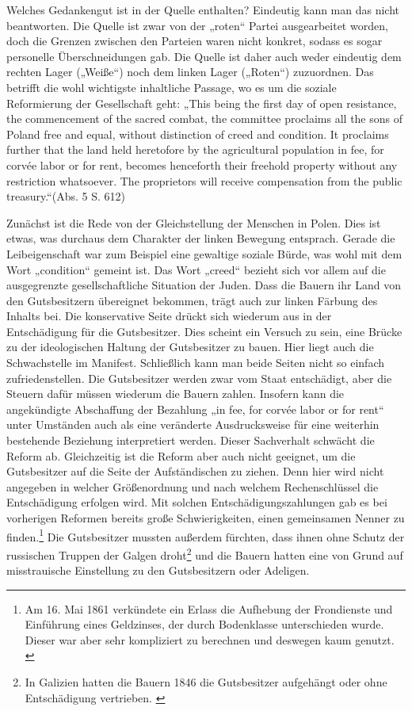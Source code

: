 \documentclass{../../sem_paper}
\begin{document}
Welches Gedankengut ist in der Quelle enthalten? Eindeutig kann man das nicht beantworten. Die
Quelle ist zwar von der „roten“ Partei ausgearbeitet worden, doch die Grenzen zwischen den
Parteien waren nicht konkret, sodass es sogar personelle Überschneidungen gab.\autocite[19]{kowalski1954} Die Quelle ist
daher auch weder eindeutig dem rechten Lager („Weiße“) noch dem linken Lager („Roten“)
zuzuordnen. Das betrifft die wohl wichtigste inhaltliche Passage, wo es um die soziale
Reformierung der Gesellschaft geht: „This being the first day of open resistance, the
commencement of the sacred combat, the committee proclaims all the sons of Poland free and
equal, without distinction of creed and condition. It proclaims further that the land held heretofore
by the agricultural population in fee, for corvée labor or for rent, becomes henceforth their freehold
property without any restriction whatsoever. The proprietors will receive compensation from the
public treasury.“(Abs. 5 S. 612)

Zunächst ist die Rede von der Gleichstellung der Menschen in Polen. Dies ist etwas, was durchaus
dem Charakter der linken Bewegung entsprach. Gerade die Leibeigenschaft war zum Beispiel eine
gewaltige soziale Bürde, was wohl mit dem Wort „condition“ gemeint ist. Das Wort „creed“ bezieht
sich vor allem auf die ausgegrenzte gesellschaftliche Situation der Juden. Dass die Bauern ihr Land
von den Gutsbesitzern übereignet bekommen, trägt auch zur linken Färbung des Inhalts bei. Die
konservative Seite drückt sich wiederum aus in der Entschädigung für die Gutsbesitzer. Dies scheint
ein Versuch zu sein, eine Brücke zu der ideologischen Haltung der Gutsbesitzer zu bauen. Hier liegt
auch die Schwachstelle im Manifest. Schließlich kann man beide Seiten nicht so einfach
zufriedenstellen. Die Gutsbesitzer werden zwar vom Staat entschädigt, aber die Steuern dafür
müssen wiederum die Bauern zahlen. Insofern kann die angekündigte Abschaffung der Bezahlung
„in fee, for corvée labor or for rent“ unter Umständen auch als eine veränderte Ausdrucksweise für
eine weiterhin bestehende Beziehung interpretiert werden. Dieser Sachverhalt schwächt die Reform
ab. Gleichzeitig ist die Reform aber auch nicht geeignet, um die Gutsbesitzer auf die Seite der
Aufständischen zu ziehen. Denn hier wird nicht angegeben in welcher Größenordnung und nach
welchem Rechenschlüssel die Entschädigung erfolgen wird. Mit solchen Entschädigungszahlungen
gab es bei vorherigen Reformen bereits große Schwierigkeiten, einen gemeinsamen Nenner zu
finden.\footnote{
Am 16. Mai 1861 verkündete ein Erlass die Aufhebung der Frondienste und Einführung eines Geldzinses, der durch
Bodenklasse unterschieden wurde. Dieser war aber sehr kompliziert zu berechnen und deswegen kaum genutzt.
\autocite[82]{gentzen1958}}
Die Gutsbesitzer mussten außerdem fürchten, dass ihnen ohne Schutz der russischen
Truppen der Galgen droht\footnote{In Galizien hatten die Bauern 1846 die Gutsbesitzer aufgehängt oder ohne Entschädigung vertrieben.
\autocite[82]{gentzen1958}} 
und die Bauern hatten eine von Grund auf misstrauische Einstellung zu
den Gutsbesitzern oder Adeligen.\autocite[4]{kowalski1954}
\end{document}
